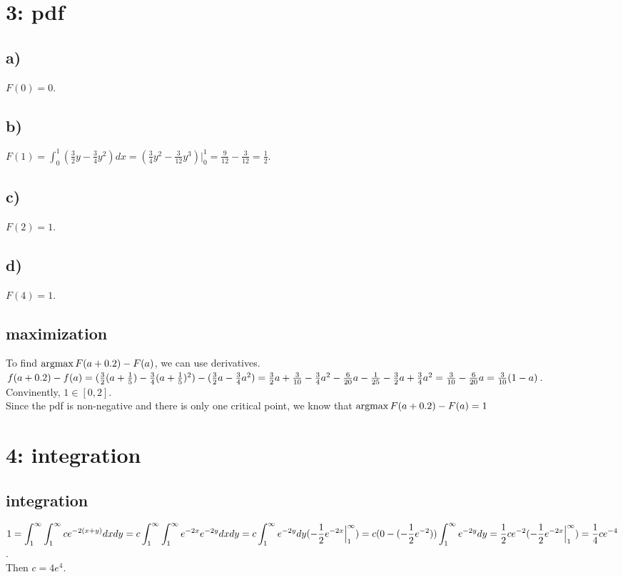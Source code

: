 \documentclass{article}
\newcommand{\argmax}{\operatornamewithlimits{argmax}}
\begin{document}
\newpage
\section*{3: pdf}
\subsection*{a)}
$F(0) = 0$.
\subsection*{b)}
$F(1)
= \int_0^1{(\frac{3}{2}y - \frac{3}{4}y^2)dx}
= (\frac{3}{4}y^2 - \frac{3}{12}y^3) \Big|_0^1
= \frac{9}{12} - \frac{3}{12}
= \frac{1}{2}$.
\subsection*{c)}
$F(2) = 1$.
\subsection*{d)}
$F(4) = 1$.
\subsection*{maximization}
To find $\argmax{F(a+0.2) - F(a)}$, we can use derivatives.
\\$f(a+0.2) - f(a)
\\= (\frac{3}{2}(a + \frac{1}{5}) - \frac{3}{4}(a + \frac{1}{5})^2)
- (\frac{3}{2}a - \frac{3}{4}a^2)
\\= \frac{3}{2}a + \frac{3}{10}
- \frac{3}{4}a^2 - \frac{6}{20}a - \frac{1}{25}
- \frac{3}{2}a + \frac{3}{4}a^2
\\= \frac{3}{10} - \frac{6}{20}a
\\= \frac{3}{10}(1 - a)$.
\\Convinently, $1 \in [0, 2]$.
\\Since the pdf is non-negative and there is only one critical point,
we know that $\argmax{F(a+0.2) - F(a)} = 1$
\newpage

\section*{4: integration}
\subsection*{integration}
$\displaystyle
1 = \int_1^\infty{\int_1^\infty{ce^{-2(x+y)}dxdy}}
\\= c\int_1^\infty{\int_1^\infty{e^{-2x}e^{-2y}dxdy}}
\\= c\int_1^\infty{e^{-2y}dy(-\frac{1}{2}e^{-2x} \Big|_1^\infty)}
\\= c(0 - (-\frac{1}{2}e^{-2}))\int_1^\infty{e^{-2y}dy}
\\= \frac{1}{2}ce^{-2}(-\frac{1}{2}e^{-2x} \Big|_1^\infty)
\\= \frac{1}{4}ce^{-4}$.
\\Then $c = 4e^4$.
\end{document}
